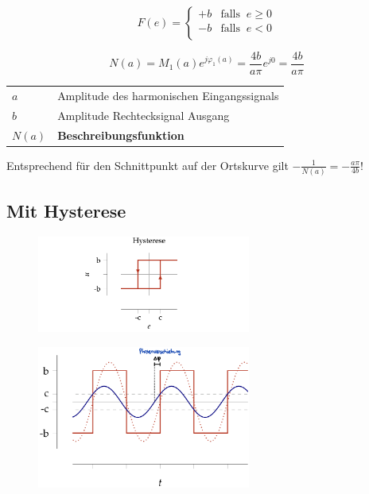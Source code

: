 \documentclass[
  10pt,
  a4paper,
  twocolumn]{article}
\makeatletter
\numberwithin{equation}{section}
\newenvironment{conditions}
  {\par\vspace{\abovedisplayskip}\noindent\begin{tabular}{>{$}l<{$} @{${}:{}$} l}}
  {\end{tabular}\par\vspace{\belowdisplayskip}}
\makeatother
\begin{document}
\[
F(e)=\left\{
\begin{array}{ll}
+b & \text{falls }\ e \geq 0 \\
-b & \text{falls }\ e < 0 \\
\end{array}
\right.
\]

\[
N(a) = M_1(a)e^{j\varphi_1(a)}=\frac{4b}{a\pi}e^{j0}=\frac{4b}{a\pi}
\]

\begin{conditions}
  a & Amplitude des harmonischen Eingangssignals \\
  b & Amplitude Rechtecksignal Ausgang \\
  N(a) & \textbf{Beschreibungsfunktion}
\end{conditions}

Entsprechend für den Schnittpunkt auf der Ortskurve gilt
\(-\frac1{N(a)}=-\frac{a\pi}{4b}\)!

\hypertarget{mit-hysterese}{%
\subsection{Mit Hysterese}\label{mit-hysterese}}

\begin{figure}[H]

{\centering \includegraphics[width=7cm,height=\textheight]{images/paste-50.png}

}

\end{figure}

\begin{figure}[H]

{\centering \includegraphics[width=7cm,height=\textheight]{images/paste-48.png}

}

\end{figure}
\end{document}

